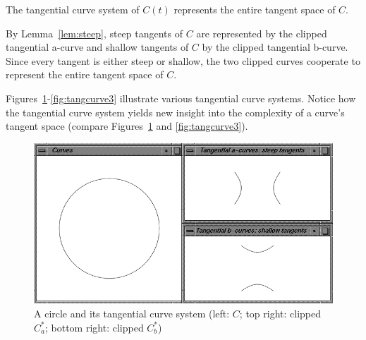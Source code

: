 \documentclass[12pt]{article}
\begin{document}
\begin{lemma}
The tangential curve system of $C(t)$ represents the entire tangent space of $C$.
\end{lemma}
\prf
By Lemma~\ref{lem:steep}, 
steep tangents of $C$ are represented by the clipped tangential a-curve and
shallow tangents of $C$ by the clipped tangential b-curve.
Since every tangent is either steep or shallow, the two clipped curves
cooperate to represent the entire tangent space of $C$.
\QED


Figures~\ref{fig:tangcurve1}-\ref{fig:tangcurve3} illustrate various 
tangential curve systems.
Notice how the tangential curve system yields new insight into the complexity of a curve's
tangent space (compare Figures~\ref{fig:tangcurve1} and \ref{fig:tangcurve3}).

\begin{figure}
\begin{center}
\includegraphics*[scale=.65]{img/jjduta1.jpg}
\end{center}
\caption{A circle and its tangential curve system (left: $C$; top right: clipped $C^*_a$; bottom right: clipped $C^*_b$)}
\label{fig:tangcurve1}
\end{figure}
\end{document}

